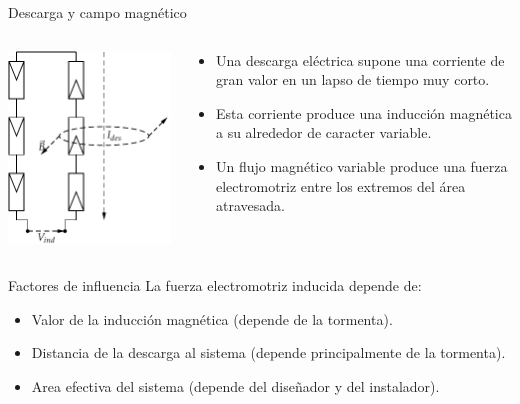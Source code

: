 \documentclass[xcolor={usenames,svgnames,dvipsnames}]{beamer}
\begin{document}
\begin{frame}[plain,label={sec:org9f98d7a}]{Descarga y campo magnético}
\begin{columns}
\begin{column}{0.6\columnwidth}
\begin{center}
\includegraphics[height=0.8\textheight]{../figs/SobretensionInducida.pdf}
\end{center}
\end{column}
\begin{column}{0.6\columnwidth}
\begin{itemize}
\item Una descarga eléctrica supone una \alert{corriente de gran valor} en un lapso de \alert{tiempo muy corto}.

\item Esta corriente produce una \alert{inducción magnética} a su alrededor de caracter \alert{variable}.

\item Un flujo magnético variable produce una \alert{fuerza electromotriz} entre los extremos del área atravesada.
\end{itemize}
\end{column}
\end{columns}
\end{frame}

\begin{frame}[label={sec:org46148e4}]{Factores de influencia}
La fuerza electromotriz inducida depende de:

\begin{itemize}
\item \alert{Valor de la inducción magnética} (depende de la tormenta).

\item \alert{Distancia} de la descarga al sistema (depende principalmente de la
tormenta).

\item \alert{Area efectiva del sistema} (depende del diseñador y del instalador).
\end{itemize}
\end{frame}
\end{document}
